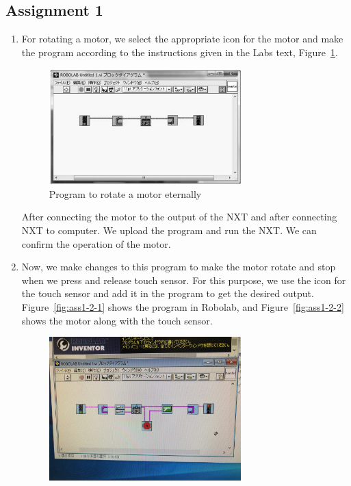\documentclass[12pt,a4paper]{report}
\begin{document}
\subsection{\textbf{Assignment 1}}
\begin{enumerate}
    \item For rotating a motor, we select the appropriate icon for the motor and make the program according to the 
instructions given in the Labs text, Figure~\ref{fig:ass1-1}. 
\begin{figure}[htbp]
    \centering
    \includegraphics[width=0.7\textwidth]{figures/ass1-1.jpg}
    \caption{Program to rotate a motor eternally}
    \label{fig:ass1-1}
\end{figure}
After connecting the motor to the output of the NXT and after connecting NXT to computer. 
We upload the program and run the NXT. We can confirm the operation of the motor. 
\item Now, we make changes to this program to make the motor rotate and stop when we press and release touch 
    sensor. For this purpose, we use the icon for the touch sensor and add it in the program to get the desired 
    output. 
    Figure~\ref{fig:ass1-2-1} shows the program in Robolab, and Figure~\ref{fig:ass1-2-2} shows the motor along 
    with the touch sensor. 
    \begin{figure}[htbp]
        \includegraphics[width=0.7\textwidth]{figures/ass1-2-1.jpg}

\end{figure}
\end{enumerate}
\end{document}
